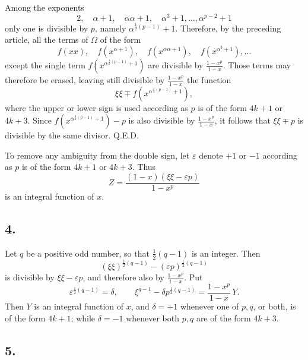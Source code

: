 \documentclass[12pt]{article}
\begin{document}
Among the exponents
\[
2,\quad \alpha+1,\quad \alpha\alpha+1,\quad \alpha^3+1,\ldots,\alpha^{p-2}+1
\]
only one is divisible by $p$, namely $\alpha^{\frac12(p-1)}+1$. Therefore, by the preceding article, all the terms of $\Omega$ of the form
\[
f(xx),\quad f(x^{\alpha+1}),\quad f(x^{\alpha\alpha+1}),\quad f(x^{\alpha^3+1}),\ldots
\]
except the single term $f(x^{\alpha^{\frac12(p-1)}+1})$ are divisible by $\frac{1-x^p}{1-x}$. Those terms may therefore be erased, leaving still divisible by $\frac{1-x^p}{1-x}$ the function
\[
\xi\xi\mp f(x^{\alpha^{\frac12(p-1)}+1}),
\]
where the upper or lower sign is used according as $p$ is of the form $4k+1$ or $4k+3$. Since $f(x^{\alpha^{\frac12(p-1)}+1})-p$ is also divisible by $\frac{1-x^p}{1-x}$, it follows that $\xi\xi\mp p$ is divisible by the same divisor. Q.E.D.

To remove any ambiguity from the double sign, let $\varepsilon$ denote $+1$ or $-1$ according as $p$ is of the form $4k+1$ or $4k+3$. Thus
\[
Z=\frac{(1-x)(\xi\xi-\varepsilon p)}{1-x^p}
\]
is an integral function of $x$.

\subsection*{4.}

Let $q$ be a positive odd number, so that $\frac12(q-1)$ is an integer. Then
\[
(\xi\xi)^{\frac12(q-1)}-(\varepsilon p)^{\frac12(q-1)}
\]
is divisible by $\xi\xi-\varepsilon p$, and therefore also by $\frac{1-x^p}{1-x}$. Put
\[
\varepsilon^{\frac12(q-1)}=\delta,\qquad
\xi^{q-1}-\delta p^{\frac12(q-1)}=\frac{1-x^p}{1-x}\,Y.
\]
Then $Y$ is an integral function of $x$, and $\delta=+1$ whenever one of $p,q$, or both, is of the form $4k+1$; while $\delta=-1$ whenever both $p,q$ are of the form $4k+3$.

\subsection*{5.}
\end{document}
